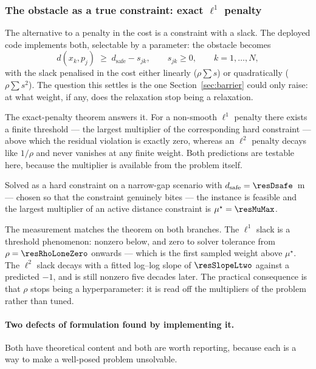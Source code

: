 \documentclass[11pt,a4paper]{article}
\newcommand{\dsafe}{d_{\mathrm{safe}}}
\begin{document}
\subsubsection{The obstacle as a true constraint: exact \texorpdfstring{$\ell^1$}{l1} penalty}
\label{sec:l1}

The alternative to a penalty in the cost is a constraint with a slack. The deployed code implements both,
selectable by a parameter: the obstacle becomes
\begin{equation}
  d(x_k,p_j)\;\ge\;\dsafe-s_{jk},\qquad s_{jk}\ge0,\qquad k=1,\dots,N,
  \label{eq:slack}
\end{equation}
with the slack penalised in the cost either linearly ($\rho\sum s$) or quadratically ($\rho\sum s^2$). The
question this settles is the one Section~\ref{sec:barrier} could only raise: at what weight, if any, does the
relaxation stop being a relaxation.

The exact-penalty theorem answers it. For a non-smooth $\ell^1$ penalty there exists a finite threshold ---
the largest multiplier of the corresponding hard constraint --- above which the residual violation is exactly
zero, whereas an $\ell^2$ penalty decays like $1/\rho$ and never vanishes at any finite weight. Both
predictions are testable here, because the multiplier is available from the problem itself.

Solved as a hard constraint on a narrow-gap scenario with $\dsafe=\resDsafe$~m --- chosen so that the
constraint genuinely bites --- the instance is feasible and the largest multiplier of an active distance
constraint is $\mu^\star=\resMuMax$.


The measurement matches the theorem on both branches. The $\ell^1$ slack is a threshold phenomenon: nonzero
below, and zero to solver tolerance from $\rho=\resRhoLoneZero$ onwards --- which is the first sampled weight
above $\mu^\star$. The $\ell^2$ slack decays with a fitted log--log slope of $\resSlopeLtwo$ against a
predicted $-1$, and is still nonzero five decades later. The practical consequence is that $\rho$ stops being
a hyperparameter: it is read off the multipliers of the problem rather than tuned.

\paragraph{Two defects of formulation found by implementing it.} Both have theoretical content and both are
worth reporting, because each is a way to make a well-posed problem unsolvable.
\end{document}
